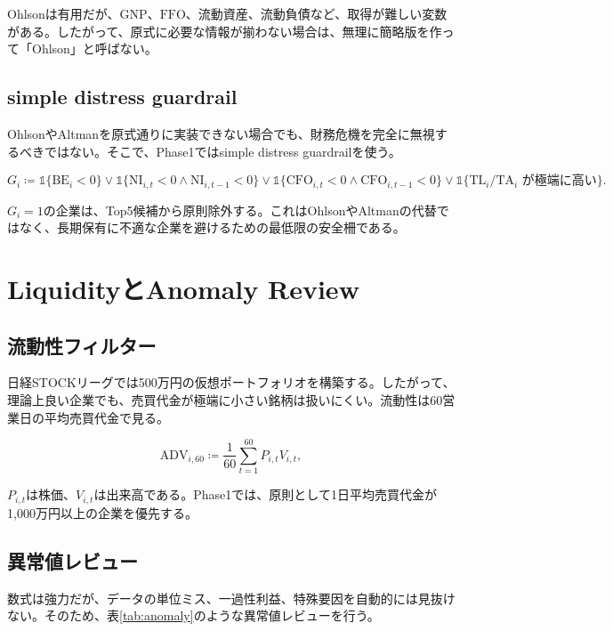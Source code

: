 \documentclass[11pt,a4paper]{article}
\newcommand{\BE}{\mathrm{BE}}
\newcommand{\NI}{\mathrm{NI}}
\newcommand{\TA}{\mathrm{TA}}
\newcommand{\TL}{\mathrm{TL}}
\newcommand{\CFO}{\mathrm{CFO}}
\newcommand{\ADV}{\mathrm{ADV}}
\newcommand{\ind}{\mathbb{1}}
\begin{document}
Ohlsonは有用だが、$\mathrm{GNP}$、$\mathrm{FFO}$、流動資産、流動負債など、取得が難しい変数がある。したがって、原式に必要な情報が揃わない場合は、無理に簡略版を作って「Ohlson」と呼ばない。

\subsection{simple distress guardrail}

OhlsonやAltmanを原式通りに実装できない場合でも、財務危機を完全に無視するべきではない。そこで、Phase1ではsimple distress guardrailを使う。

\begin{equation}
G_i \coloneqq \ind\{\BE_i<0\}
\lor \ind\{\NI_{i,t}<0 \land \NI_{i,t-1}<0\}
\lor \ind\{\CFO_{i,t}<0 \land \CFO_{i,t-1}<0\}
\lor \ind\{\TL_i/\TA_i \text{ が極端に高い}\}.
\label{eq:guardrail}
\end{equation}

$G_i=1$の企業は、Top5候補から原則除外する。これはOhlsonやAltmanの代替ではなく、長期保有に不適な企業を避けるための最低限の安全柵である。

\clearpage
\section{LiquidityとAnomaly Review}

\subsection{流動性フィルター}

日経STOCKリーグでは500万円の仮想ポートフォリオを構築する。したがって、理論上良い企業でも、売買代金が極端に小さい銘柄は扱いにくい。流動性は60営業日の平均売買代金で見る。

\begin{equation}
\ADV_{i,60} \coloneqq \frac{1}{60}\sum_{t=1}^{60} P_{i,t}V_{i,t},
\label{eq:adv}
\end{equation}

$P_{i,t}$は株価、$V_{i,t}$は出来高である。Phase1では、原則として1日平均売買代金が1,000万円以上の企業を優先する。

\subsection{異常値レビュー}

数式は強力だが、データの単位ミス、一過性利益、特殊要因を自動的には見抜けない。そのため、表\ref{tab:anomaly}のような異常値レビューを行う。
\end{document}
